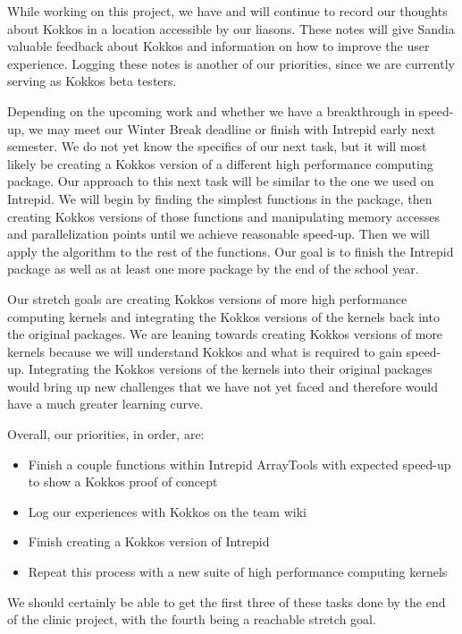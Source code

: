 \documentclass[midyear]{hmcclinic}
\begin{document}
While working on this project, we have and will continue to record our
thoughts about Kokkos in a location accessible by our liasons. 
These notes will give Sandia valuable feedback about Kokkos and
information on how to improve the user experience. Logging these
notes is another of our priorities, since we are currently serving
as Kokkos beta testers. 

Depending on the upcoming work and whether we have a breakthrough in speed-up,
we may meet our Winter Break deadline or finish with Intrepid early next semester. We do not yet
know the specifics of our next task, but it will most likely be
creating a Kokkos version of a different high performance computing package.
Our approach to this next task will be similar to the one we used on Intrepid. We will begin by
finding the simplest functions in the package, then creating Kokkos versions of
those functions and manipulating memory accesses and parallelization points until we
achieve reasonable speed-up. Then we will apply the algorithm to the rest of the
functions. Our goal is to finish the Intrepid package as well as at least one
more package by the end of the school year. 

Our stretch goals are creating Kokkos versions of more high
performance computing kernels and integrating the Kokkos versions of the kernels
back into the original packages. We are leaning towards creating
Kokkos versions of more kernels because we will understand
Kokkos and what is required to gain speed-up. Integrating the Kokkos versions
of the kernels into their original packages would bring up new challenges that we
have not yet faced and therefore would have a much greater learning curve. 

Overall, our priorities, in order, are: 
\begin{itemize}
	\item Finish a couple functions within Intrepid ArrayTools
	with expected speed-up to show a Kokkos proof of concept
	
	\item Log our experiences with Kokkos on the team wiki
	
	\item Finish creating a Kokkos version of Intrepid
	
	\item Repeat this process with a new suite of high performance
	computing kernels
\end{itemize}
We should certainly be able to get the first three of these tasks done
by the end of the clinic project, with the fourth being a reachable stretch goal.
\end{document}
